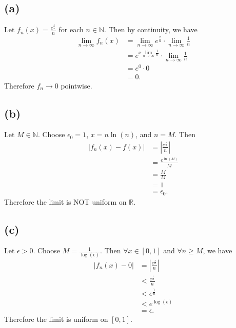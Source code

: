 \documentclass{article}
\newcommand{\R}{\mathbb{R}} %
\newcommand{\N}{\mathbb{N}} %
\begin{document}
\subsection{(a)}
Let $f_n(x) = \frac{e^{\frac{x}{n}}}{n}$ for each $n \in \N$. Then by continuity, we have
\begin{align}
	\lim\limits_{n \to \infty} f_n(x) &= \lim\limits_{n \to \infty} e^{\frac{x}{n}} \cdot \lim\limits_{n \to \infty} \frac{1}{n} \\
	&= e^{x \lim\limits_{n \to \infty}\frac{1}{n}} \cdot \lim\limits_{n \to \infty} \frac{1}{n} \\
	&= e^0 \cdot 0 \\
	&= 0.
\end{align}
Therefore $f_n \to 0$ pointwise.

\subsection*{(b)}
Let $M \in \N$. Choose $\epsilon_0 = 1$, $x = n \ln(n)$, and $n = M$. Then
\begin{align}
	|f_n(x) - f(x)| &= \left|\frac{e^{\frac{x}{n}}}{n}\right| \\
	&= \frac{e^{\ln(M)}}{M} \\
	&= \frac{M}{M} \\
	&= 1 \\
	&= \epsilon_0.
\end{align}
Therefore the limit is NOT uniform on $\R$.

\subsection*{(c)}
Let $\epsilon > 0$. Choose $M = \frac{1}{\log(\epsilon)}$. Then $\forall x \in [0, 1]$ and $\forall n \geq M$, we have
\begin{align}
	|f_n(x) - 0| &= \left|\frac{e^\frac{x}{n}}{n}\right| \\
	&< \frac{e^\frac{1}{n}}{n} \\
	&< e^\frac{1}{n} \\
	&< e^{\log(\epsilon)} \\
	&= \epsilon.
\end{align}
Therefore the limit is uniform on $[0, 1]$.
\end{document}
